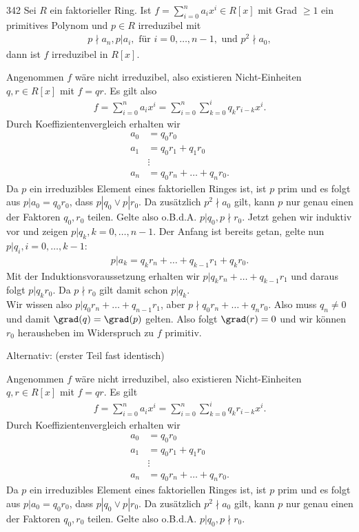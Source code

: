 \begin{algebraUE}{342}
Sei $R$ ein faktorieller Ring. Ist $f = \sum_{i=0}^na_ix^i \in R[x]$ mit Grad $\geq 1$
ein primitives Polynom und $p \in R$ irreduzibel mit
\begin{align*}
  p \nmid a_n, p | a_i, \text{ für } i = 0,\dots,n-1, \text{ und } p^2 \nmid a_0,
\end{align*}
dann ist $f$ irreduzibel in $R[x]$.
\end{algebraUE}

\begin{solution}
Angenommen $f$ wäre nicht irreduzibel, also existieren Nicht-Einheiten $q,r \in R[x]$ mit $f = qr$.
Es gilt also
\begin{align*}
  f = \sum_{i=0}^na_ix^i = \sum_{i = 0}^n \sum_{k= 0}^i q_kr_{i-k}x^i.
\end{align*}
Durch Koeffizientenvergleich erhalten wir
\begin{align*}
  a_0 &= q_0r_0 \\
  a_1 &= q_0r_1 + q_1r_0 \\
  &\vdots \\
  a_n &= q_0r_n + \dots + q_nr_0.
\end{align*}
Da $p$ ein irreduzibles Element eines faktoriellen Ringes ist, ist $p$ prim und es folgt
aus $p| a_0 = q_0r_0$, dass $p|q_0 \lor p|r_0$. Da zusätzlich $p^2 \nmid a_0$ gilt,
kann $p$ nur genau einen der Faktoren $q_0,r_0$ teilen. Gelte also o.B.d.A. $p | q_0, p \nmid r_0$.
Jetzt gehen wir induktiv vor und zeigen $p | q_k, k = 0,\dots,n-1$. Der Anfang ist bereits getan,
gelte nun $p | q_{i}, i = 0,\dots,k-1$:
\begin{align*}
  p | a_k = q_kr_n + \dots + q_{k-1}r_1 + q_kr_0.
\end{align*}
Mit der Induktionsvoraussetzung erhalten wir $p | q_kr_n + \dots + q_{k-1}r_1$
und daraus folgt $p | q_kr_0$. Da $p \nmid r_0$ gilt damit schon $p | q_k$. \\
Wir wissen also $p | q_0r_n + \dots + q_{n-1}r_1$, aber $p \nmid q_0r_n + \dots + q_nr_0$.
Also muss $q_n \neq 0$ und damit $\grad(q) = \grad(p)$ gelten. Also folgt $\grad(r) = 0$
und wir können $r_0$ herausheben im Widerspruch zu $f$ primitiv.

Alternativ: (erster Teil fast identisch)

Angenommen $f$ wäre nicht irreduzibel, also existieren Nicht-Einheiten $q,r \in R[x]$ mit $f = qr$.
Es gilt
\begin{align*}
  f = \sum_{i=0}^na_ix^i = \sum_{i = 0}^n \sum_{k= 0}^i q_kr_{i-k}x^i.
\end{align*}
Durch Koeffizientenvergleich erhalten wir
\begin{align*}
  a_0 &= q_0r_0 \\
  a_1 &= q_0r_1 + q_1r_0 \\
  &\vdots \\
  a_n &= q_0r_n + \dots + q_nr_0.
\end{align*}
Da $p$ ein irreduzibles Element eines faktoriellen Ringes ist, ist $p$ prim und es folgt
aus $p| a_0 = q_0r_0$, dass $p|q_0 \lor p|r_0$. Da zusätzlich $p^2 \nmid a_0$ gilt,
kann $p$ nur genau einen der Faktoren $q_0,r_0$ teilen. Gelte also o.B.d.A. $p | q_0, p \nmid r_0$.


\end{solution}
